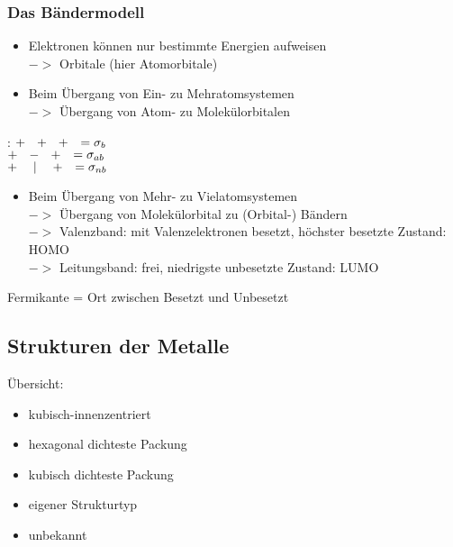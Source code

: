 \documentclass[a4paper, 12pt]{article}
\begin{document}
\subsubsection{Das Bändermodell}
\begin{itemize}
    \item Elektronen können nur bestimmte Energien aufweisen\\$->$ Orbitale (hier Atomorbitale)
    \item Beim Übergang von Ein- zu Mehratomsystemen\\$->$ Übergang von Atom- zu Molekülorbitalen
\end{itemize}
: $+\hspace*{0.25cm}+\hspace*{0.25cm}+\hspace*{0.25cm} = \sigma_b$\\
\hspace*{0.85cm}$+\hspace*{0.25cm}-\hspace*{0.25cm}+\hspace*{0.25cm} = \sigma_{ab}$\\
\hspace*{0.85cm}$+\hspace*{0.45cm}|\hspace*{0.45cm}+\hspace*{0.25cm} = \sigma_{nb}$
\begin{itemize}
    \item Beim Übergang von Mehr- zu Vielatomsystemen\\$->$ Übergang von Molekülorbital zu (Orbital-) Bändern\\$->$ Valenzband: mit Valenzelektronen besetzt, höchster besetzte Zustand: HOMO\\$->$ Leitungsband: frei, niedrigste unbesetzte Zustand: LUMO
\end{itemize}
Fermikante = Ort zwischen Besetzt und Unbesetzt\\
\subsection{Strukturen der Metalle}
Übersicht:
\begin{itemize}
    \item kubisch-innenzentriert
    \item hexagonal dichteste Packung
    \item kubisch dichteste Packung
    \item eigener Strukturtyp
    \item unbekannt
\end{itemize}
\end{document}
